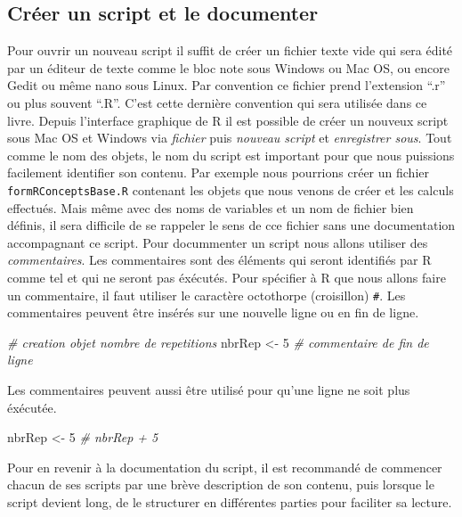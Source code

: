 \documentclass[]{book}
\newenvironment{Shaded}{\begin{snugshade}}{\end{snugshade}}
\newcommand{\DecValTok}[1]{\textcolor[rgb]{0.00,0.00,0.81}{#1}}
\newcommand{\StringTok}[1]{\textcolor[rgb]{0.31,0.60,0.02}{#1}}
\newcommand{\CommentTok}[1]{\textcolor[rgb]{0.56,0.35,0.01}{\textit{#1}}}
\newcommand{\NormalTok}[1]{#1}
\begin{document}
\subsection{Créer un script et le
documenter}\label{creer-un-script-et-le-documenter}

Pour ouvrir un nouveau script il suffit de créer un fichier texte vide
qui sera édité par un éditeur de texte comme le bloc note sous Windows
ou Mac OS, ou encore Gedit ou même nano sous Linux. Par convention ce
fichier prend l'extension ``.r'' ou plus souvent ``.R''. C'est cette
dernière convention qui sera utilisée dans ce livre. Depuis l'interface
graphique de R il est possible de créer un nouveux script sous Mac OS et
Windows via \emph{fichier} puis \emph{nouveau script} et
\emph{enregistrer sous}. Tout comme le nom des objets, le nom du script
est important pour que nous puissions facilement identifier son contenu.
Par exemple nous pourrions créer un fichier \texttt{formRConceptsBase.R}
contenant les objets que nous venons de créer et les calculs effectués.
Mais même avec des noms de variables et un nom de fichier bien définis,
il sera difficile de se rappeler le sens de cce fichier sans une
documentation accompagnant ce script. Pour docummenter un script nous
allons utiliser des \emph{commentaires}. Les commentaires sont des
éléments qui seront identifiés par R comme tel et qui ne seront pas
éxécutés. Pour spécifier à R que nous allons faire un commentaire, il
faut utiliser le caractère octothorpe (croisillon) \texttt{\#}. Les
commentaires peuvent être insérés sur une nouvelle ligne ou en fin de
ligne.

\begin{Shaded}
\begin{Highlighting}[]
\CommentTok{# creation objet nombre de repetitions}
\NormalTok{nbrRep <-}\StringTok{ }\DecValTok{5} \CommentTok{# commentaire de fin de ligne}
\end{Highlighting}
\end{Shaded}

Les commentaires peuvent aussi être utilisé pour qu'une ligne ne soit
plus éxécutée.

\begin{Shaded}
\begin{Highlighting}[]
\NormalTok{nbrRep <-}\StringTok{ }\DecValTok{5}
\CommentTok{# nbrRep + 5}
\end{Highlighting}
\end{Shaded}

Pour en revenir à la documentation du script, il est recommandé de
commencer chacun de ses scripts par une brève description de son
contenu, puis lorsque le script devient long, de le structurer en
différentes parties pour faciliter sa lecture.
\end{document}
